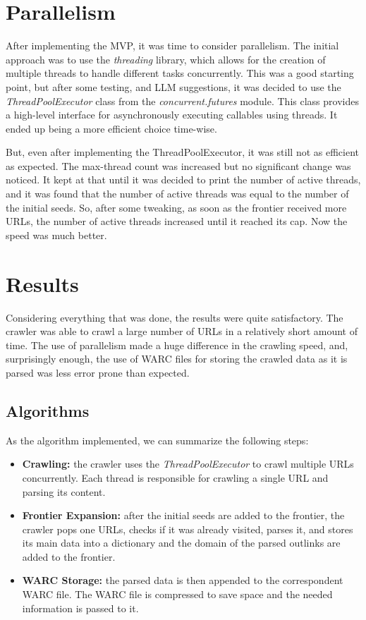 \section{Parallelism}

After implementing the MVP, it was time to consider parallelism. The initial approach was to use the \textit{threading} library, which allows for the creation of multiple threads to handle different tasks concurrently. This was a good starting point, but after some testing, and LLM suggestions, it was decided to use the \textit{ThreadPoolExecutor} class from the \textit{concurrent.futures} module. This class provides a high-level interface for asynchronously executing callables using threads. It ended up being a more efficient choice time-wise.

But, even after implementing the ThreadPoolExecutor, it was still not as efficient as expected. The max-thread count was increased but no significant change was noticed. It kept at that until it was decided to print the number of active threads, and it was found that the number of active threads was equal to the number of the initial seeds. So, after some tweaking, as soon as the frontier received more URLs, the number of active threads increased until it reached its cap. Now the speed was much better.

\section{Results}

Considering everything that was done, the results were quite satisfactory. The crawler was able to crawl a large number of URLs in a relatively short amount of time. The use of parallelism made a huge difference in the crawling speed, and, surprisingly enough, the use of WARC files for storing the crawled data as it is parsed was less error prone than expected.

\subsection{Algorithms}

As the algorithm implemented, we can summarize the following steps:

\begin{itemize}
  \item \textbf{Crawling:} the crawler uses the \textit{ThreadPoolExecutor} to crawl multiple URLs concurrently. Each thread is responsible for crawling a single URL and parsing its content.
  \item \textbf{Frontier Expansion:} after the initial seeds are added to the frontier, the crawler pops one URLs, checks if it was already visited, parses it, and stores its main data into a dictionary and the domain of the parsed outlinks are added to the frontier.
  \item \textbf{WARC Storage:} the parsed data is then appended to the correspondent WARC file. The WARC file is compressed to save space and the needed information is passed to it.
\end{itemize}

